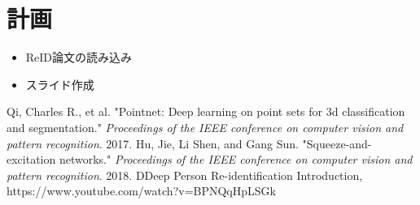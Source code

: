 \documentclass[dvipdfmx]{jsarticle}
\begin{document}
\section{計画}
\begin{itemize}
    \item ReID論文の読み込み
    \item スライド作成
\end{itemize}
\begin{thebibliography}{}
\bibitem [1] Qi, Charles R., et al. "Pointnet: Deep learning on point sets for 3d classification and segmentation." \textit{Proceedings of the IEEE conference on computer vision and pattern recognition}. 2017.
\bibitem [2] Hu, Jie, Li Shen, and Gang Sun. "Squeeze-and-excitation networks." \textit{Proceedings of the IEEE conference on computer vision and pattern recognition}. 2018.
\bibitem [3] DDeep Person Re-identification Introduction, https://www.youtube.com/watch?v=BPNQqHpLSGk
\end{thebibliography}
\end{document}
